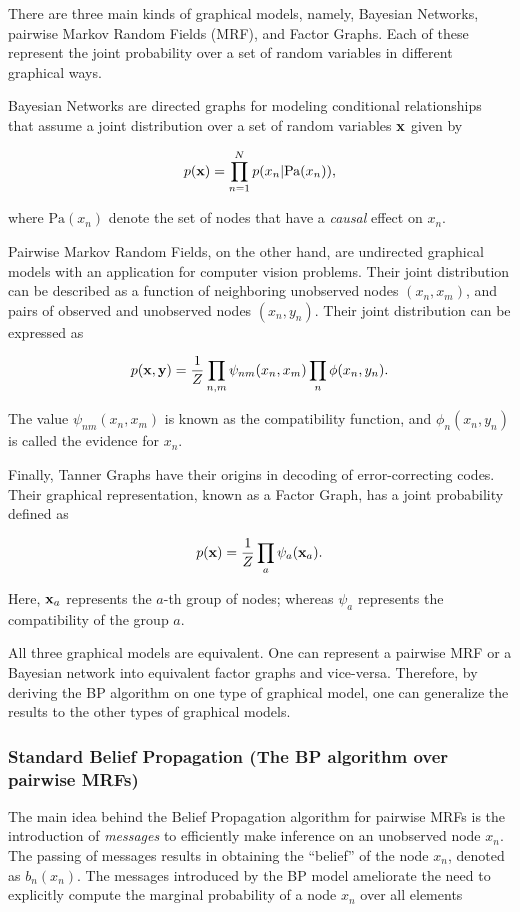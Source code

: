\documentclass[11pt]{article}
\begin{document}
There are three main kinds of graphical models, namely, Bayesian Networks, pairwise Markov Random Fields (MRF), and Factor Graphs. Each of these represent the joint probability over a set of random variables in different graphical ways.


Bayesian Networks are directed graphs for modeling conditional relationships that assume a joint distribution over a set of random variables $\bf x$ given by

\begin{equation*}
	p({\bf x}) = \prod_{n=1}^Np(x_n\vert \text{Pa}(x_n)),
\end{equation*}

where $\text{Pa}(x_n)$ denote the set of nodes that have a \textit{causal} effect on $x_n$.

Pairwise Markov Random Fields, on the other hand, are undirected graphical models with an application for computer vision problems. Their joint distribution can be described as a function of neighboring unobserved nodes $(x_n, x_m)$, and pairs of observed and unobserved nodes $(x_n, y_n)$. Their joint distribution can be expressed as

\begin{equation*}
	p({\bf x}, {\bf y}) = \frac{1}{Z}\prod_{n,m}\psi_{nm}(x_n, x_m)\prod_{n}\phi(x_n, y_n).
\end{equation*}

The value $\psi_{nm}(x_n, x_m)$ is known as the compatibility function, and $\phi_n(x_n, y_n)$ is called the evidence for $x_n$.

Finally, Tanner Graphs have their origins in decoding of error-correcting codes. Their graphical representation, known as a Factor Graph, has a joint probability defined as

\begin{equation*}
	p({\bf x}) = \frac{1}{Z}\prod_{a} \psi_a({\bf x}_a).
\end{equation*}

Here, ${\bf x}_a$ represents the $a$-th group of nodes; whereas $\psi_a$ represents the compatibility of the group $a$.

All three graphical models are equivalent. One can represent a pairwise MRF or a Bayesian network into equivalent factor graphs and vice-versa. Therefore, by deriving the BP algorithm on one type of graphical model, one can generalize the results to the other types of graphical models.

\subsubsection*{Standard Belief Propagation (The BP algorithm over pairwise MRFs)}
The main idea behind the Belief Propagation algorithm for pairwise MRFs is the introduction of \textit{messages} to efficiently make inference on an unobserved node $x_n$. The passing of messages results in obtaining the ``belief'' of the node $x_n$, denoted as $b_n(x_n)$. The messages introduced by the BP model ameliorate the need to explicitly compute the marginal probability of a node $x_n$ over all elements
\end{document}
